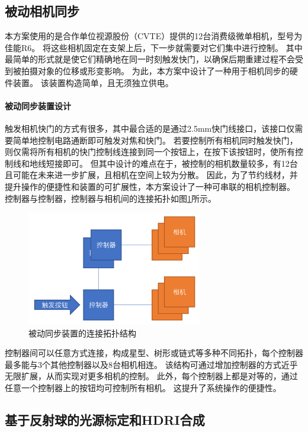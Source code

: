 \subsection{被动相机同步}
\label{sec:passive_sync}

本方案使用的是合作单位视源股份（CVTE）提供的12台消费级微单相机，型号为佳能R6。
将这些相机固定在支架上后，下一步就需要对它们集中进行控制。
其中最简单的形式就是使它们精确地在同一时刻触发快门，以确保后期重建过程不会受到被拍摄对象的位移或形变影响。
为此，本方案中设计了一种用于相机同步的硬件装置。
该装置构造简单，且无须独立供电。

\paragraph{被动同步装置设计}
触发相机快门的方式有很多，其中最合适的是通过2.5mm快门线接口，该接口仅需要简单地控制电路通断即可触发对焦和快门。
若要控制所有相机同时触发快门，则仅需将所有相机的快门控制线连接到同一个按钮上，在按下该按钮时，使所有控制线和地线短接即可。
但其中设计的难点在于，被控制的相机数量较多，有12台且可能在未来进一步扩展，且相机在空间上较为分散。
因此，为了节约线材，并提升操作的便捷性和装置的可扩展性，本方案设计了一种可串联的相机控制器。
控制器与控制器，控制器与相机间的连接拓扑如图\ref{fig:passive_sync_topo}所示。
\begin{figure}
    \centering
    \includegraphics[height=5cm]{figures/passive_sync_topo}
    \caption{被动同步装置的连接拓扑结构}
    \label{fig:passive_sync_topo}
\end{figure}
控制器间可以任意方式连接，构成星型、树形或链式等多种不同拓扑，每个控制器最多能与3个其他控制器以及8台相机相连。
该结构可通过增加控制器的方式近乎无限扩展，从而实现对更多相机的控制。
此外，每个控制器上都是对等的，通过任意一个控制器上的按钮均可控制所有相机。
这提升了系统操作的便捷性。



\subsection{基于反射球的光源标定和HDRI合成}
\label{sec:light_calib}

